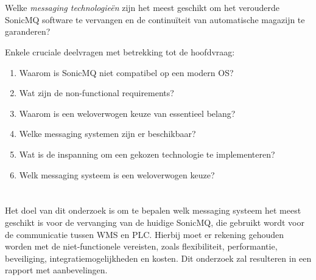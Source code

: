  
\section{}%
\label{sec:Onderzoeksvraag}


Welke \emph{messaging technologieën} zijn het meest geschikt om het verouderde SonicMQ software te vervangen 
en de continuïteit van automatische magazijn te garanderen?
\newline

Enkele cruciale deelvragen met betrekking tot de hoofdvraag:
\begin{enumerate}
  \item Waarom is SonicMQ niet compatibel op een modern OS?
  \item Wat zijn de non-functional requirements?
  \item Waarom is een weloverwogen keuze van essentieel belang?
  \item Welke messaging systemen zijn er beschikbaar?
  \item Wat is de inspanning om een gekozen technologie te implementeren?
  \item Welk messaging systeem is een weloverwogen keuze?
\end{enumerate}


\section{}%
\label{sec:Onderzoeksdoelstelling}


Het doel van dit onderzoek is om te bepalen welk messaging systeem het meest geschikt is voor de vervanging van de huidige SonicMQ,
die gebruikt wordt voor de communicatie tussen WMS en PLC. 
Hierbij moet er rekening gehouden worden met de niet-functionele vereisten,
zoals flexibiliteit, performantie, beveiliging, integratiemogelijkheden en kosten.
Dit onderzoek zal resulteren in een rapport met aanbevelingen.

